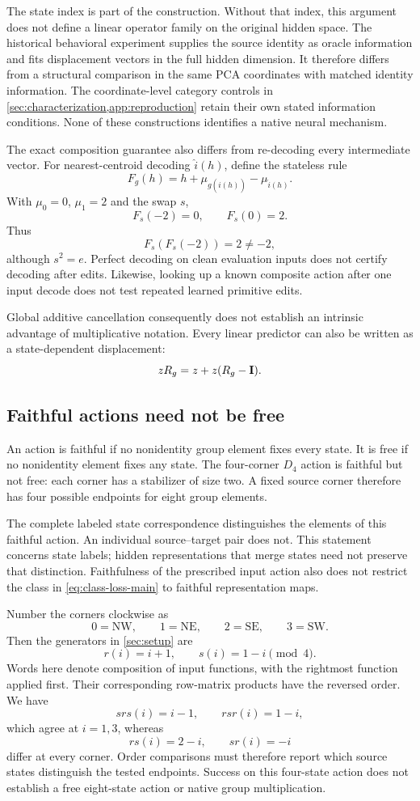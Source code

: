 The state index is part of the construction.
Without that index, this argument does not define a
linear operator family on the original hidden space.
The historical behavioral experiment supplies the source
identity as oracle information and fits displacement
vectors in the full hidden dimension.
It therefore differs from a structural comparison in
the same PCA coordinates with matched identity
information.
The coordinate-level category controls in
\cref{sec:characterization,app:reproduction} retain their
own stated information conditions.
None of these constructions identifies a native neural
mechanism.

The exact composition guarantee also differs from
re-decoding every intermediate vector.
For nearest-centroid decoding $\widehat i(h)$, define
the stateless rule
\[
 F_g(h)
 =
 h+\mu_{g(\widehat i(h))}-\mu_{\widehat i(h)}.
\]
With $\mu_0=0$, $\mu_1=2$ and the swap $s$,
\[
 F_s(-2)=0,\qquad F_s(0)=2.
\]
Thus
\[
 F_s(F_s(-2))=2\ne-2,
\]
although $s^2=e$.
Perfect decoding on clean evaluation inputs does not
certify decoding after edits.
Likewise, looking up a known composite action after one
input decode does not test repeated learned primitive
edits.

Global additive cancellation consequently does not
establish an intrinsic advantage of multiplicative
notation.
Every linear predictor can also be written as a
state-dependent displacement:
\[
 zR_g=z+z(R_g-\mathbf{I}).
\]


\subsection{Faithful actions need not be free}
\label{app:faithful-not-free}

An action is faithful if no nonidentity group element
fixes every state.
It is free if no nonidentity element fixes any state.
The four-corner $D_4$ action is faithful but not free:
each corner has a stabilizer of size two.
A fixed source corner therefore has four possible
endpoints for eight group elements.

The complete labeled state correspondence distinguishes
the elements of this faithful action.
An individual source--target pair does not.
This statement concerns state labels; hidden
representations that merge states need not preserve
that distinction.
Faithfulness of the prescribed input action also does
not restrict the class in \cref{eq:class-loss-main} to
faithful representation maps.

Number the corners clockwise as
\[
 0=\mathrm{NW},\qquad
 1=\mathrm{NE},\qquad
 2=\mathrm{SE},\qquad
 3=\mathrm{SW}.
\]
Then the generators in \cref{sec:setup} are
\[
 r(i)=i+1,\qquad s(i)=1-i
 \pmod 4.
\]
Words here denote composition of input functions, with
the rightmost function applied first.
Their corresponding row-matrix products have the
reversed order.
We have
\[
 srs(i)=i-1,\qquad rsr(i)=1-i,
\]
which agree at $i=1,3$, whereas
\[
 rs(i)=2-i,\qquad sr(i)=-i
\]
differ at every corner.
Order comparisons must therefore report which source
states distinguish the tested endpoints.
Success on this four-state action does not establish
a free eight-state action or native group multiplication.


